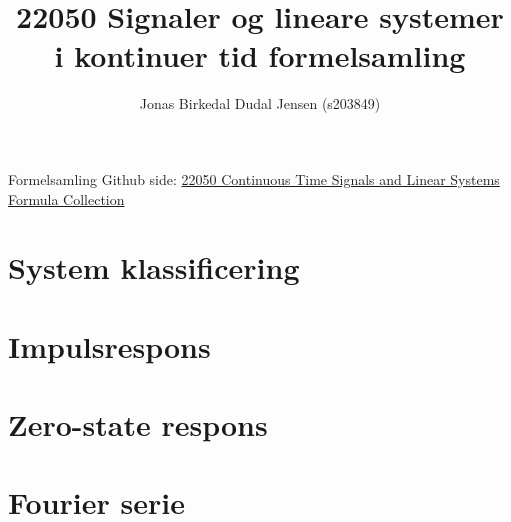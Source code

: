 \documentclass{article}
\title{22050 Signaler og lineare systemer i kontinuer tid formelsamling}
\date{}
\author{Jonas Birkedal Dudal Jensen (s203849)}
\begin{document}
	\maketitle
	\begin{center}
		Formelsamling Github side: \href{https://github.com/jondalnas/22050-Continuous-Time-Signals-and-Linear-Systems-Formula-Collection}{22050 Continuous Time Signals and Linear Systems Formula Collection}
	\end{center}

	\section{System klassificering}
	

	\section{Impulsrespons}
	

	\section{Zero-state respons}
	

	\section{Fourier serie}
	
\end{document}
